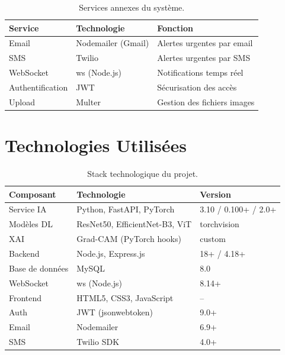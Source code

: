 \documentclass[12pt,a4paper,oneside]{report}
\begin{document}
\begin{table}[H]
\centering
\caption{Services annexes du système.}
\label{tab:services}
\begin{tabular}{|l|l|l|}
\hline
\textbf{Service} & \textbf{Technologie} & \textbf{Fonction} \\
\hline
Email & Nodemailer (Gmail) & Alertes urgentes par email \\
SMS & Twilio & Alertes urgentes par SMS \\
WebSocket & ws (Node.js) & Notifications temps réel \\
Authentification & JWT & Sécurisation des accès \\
Upload & Multer & Gestion des fichiers images \\
\hline
\end{tabular}
\end{table}

\section{Technologies Utilisées}

\begin{table}[H]
\centering
\caption{Stack technologique du projet.}
\label{tab:stack}
\begin{tabular}{|l|l|l|}
\hline
\textbf{Composant} & \textbf{Technologie} & \textbf{Version} \\
\hline
Service IA & Python, FastAPI, PyTorch & 3.10 / 0.100+ / 2.0+ \\
Modèles DL & ResNet50, EfficientNet-B3, ViT & torchvision \\
XAI & Grad-CAM (PyTorch hooks) & custom \\
Backend & Node.js, Express.js & 18+ / 4.18+ \\
Base de données & MySQL & 8.0 \\
WebSocket & ws (Node.js) & 8.14+ \\
Frontend & HTML5, CSS3, JavaScript & -- \\
Auth & JWT (jsonwebtoken) & 9.0+ \\
Email & Nodemailer & 6.9+ \\
SMS & Twilio SDK & 4.0+ \\
\hline
\end{tabular}
\end{table}

\newpage

\end{document}
